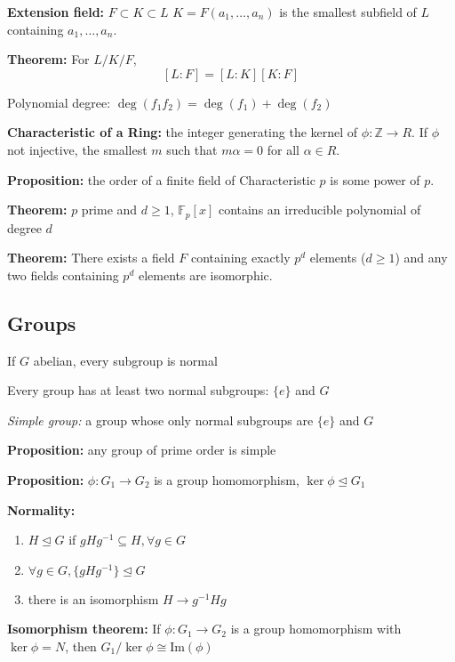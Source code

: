 \documentclass[11pt]{article}
\newcommand{\Z}{\mathbb{Z}}
\begin{document}
\begin{multicols}{2}
        \textbf{Extension field:} $F \subset K \subset L$ $K = F(a_1, \dots, a_n)$ is the smallest subfield of $L$ containing $a_1, \dots, a_n$. 

        \textbf{Theorem:} For $L/K/F$,
        \[[L:F] = [L:K][K:F]\]

        Polynomial degree: $\deg(f_1 f_2) = \deg(f_1) + \deg(f_2)$

        \textbf{Characteristic of a Ring:} the integer generating the kernel of $\phi: \Z \to R$. If $\phi$ not injective, the smallest $m$ such that $m\alpha = 0$ for all $\alpha \in R$. 

        \textbf{Proposition:} the order of a finite field of Characteristic $p$ is some power of $p$.

        \textbf{Theorem:} $p$ prime and $d \geq 1$, $\mathbb{F}_p[x]$ contains an irreducible polynomial of degree $d$ 

        \textbf{Theorem:} There exists a field $F$ containing exactly $p^d$ elements ($d\geq 1$) and any two fields containing $p^d$ elements are isomorphic.

    \subsection*{Groups}
        If $G$ abelian, every subgroup is normal 

        Every group has at least two normal subgroups: $\{e\}$ and $G$ 

        \emph{Simple group:} a group whose only normal subgroups are $\{e\}$ and $G$

        \textbf{Proposition:} any group of prime order is simple

        \textbf{Proposition:} $\phi: G_1 \to G_2$ is a group homomorphism, $\ker \phi \trianglelefteq G_1$  

        \textbf{Normality:}
        \begin{enumerate}
            \item $H \trianglelefteq G$ if $gHg^{-1} \subseteq H, \forall g \in G$
            \item $\forall g\in G, \{gHg^{-1}\} \trianglelefteq G$
            \item there is an isomorphism $H \to g^{-1}Hg$
        \end{enumerate}

        \textbf{Isomorphism theorem:} If $\phi: G_1 \to G_2$ is a group homomorphism with $\ker \phi = N$, then $G_1/\ker{\phi} \cong \text{Im}(\phi)$


\end{multicols}
\end{document}
